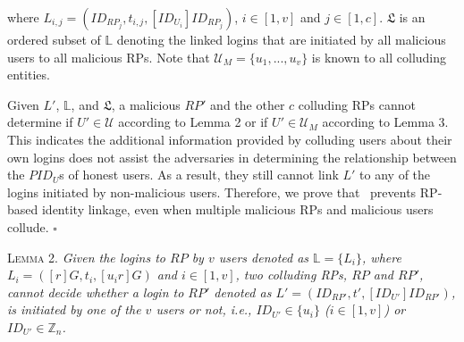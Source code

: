 \noindent where $L_{i,j} = (ID_{RP_j}, t_{i,j}, [ID_{U_i}]ID_{RP_j})$, $i \in [1, v]$ and $j \in [1, c]$. $\mathfrak{L}$ is an ordered subset of $\mathbb{L}$ denoting the linked logins that are initiated by all malicious users to all malicious RPs. Note that $\mathcal{U}_M=\{u_1,...,u_v\}$ is known to all colluding entities.

Given $L'$, $\mathbb{L}$, and $\mathfrak{L}$, a malicious $RP'$ and the other $c$ colluding RPs cannot determine if $U' \in \mathcal{U}$ according to Lemma 2 or if $U' \in \mathcal{U}_M$ according to Lemma 3. This indicates the additional information provided by colluding users about their own logins does not assist the adversaries in determining the relationship between the $PID_U$s of honest users.
As a result, they still cannot link $L'$ to any of the logins initiated by non-malicious users. Therefore, we prove that \usso~prevents RP-based identity linkage, even when multiple malicious RPs and malicious users collude. \hfill $\square$


\vspace{3mm}
\noindent\textsc{Lemma 2.} {\em Given the logins to $RP$ by $v$ users denoted as $\mathbb{L} = \{{L_i}\}$, where $L_i = ([r]G, t_i, [u_i r]G)$ and $i \in [1, v]$, two colluding RPs, $RP$ and $RP'$, cannot decide whether a login to $RP'$ denoted as $L' = (ID_{RP'}, t', [ID_{U'}]ID_{RP'})$, is initiated by one of the $v$ users or not, i.e., $ID_{U'} \in \{u_i\}$ ($i \in [1, v]$) or $ID_{U'} \in \mathbb{Z}_n$.}



